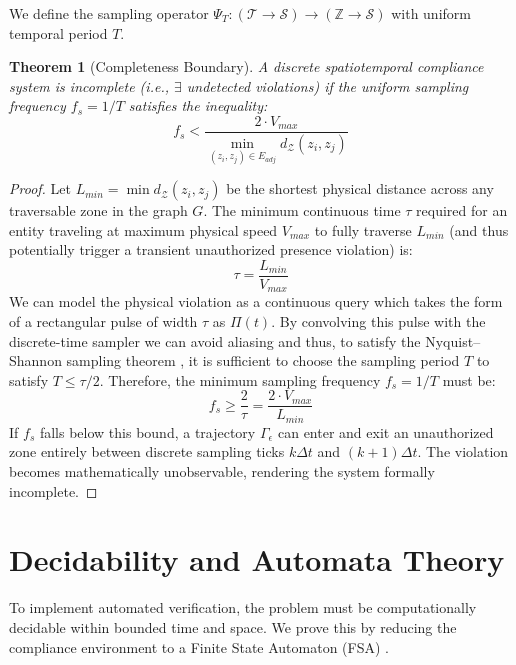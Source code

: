 \documentclass[conference]{IEEEtran}
\newtheorem{theorem}{Theorem}
\newcommand{\Z}{\mathcal{Z}} %
\newcommand{\T}{\mathcal{T}} %
\newcommand{\Sstate}{\mathcal{S}} %
\newcommand{\Tr}{\Gamma} %
\begin{document}
We define the sampling operator $\Psi_T: (\T \to \Sstate) \to (\mathbb{Z} \to \Sstate)$ with uniform temporal period $T$.



\begin{theorem}[Completeness Boundary]
A discrete spatiotemporal compliance system is incomplete (i.e., $\exists$ undetected violations) if the uniform sampling frequency $f_s = 1/T$ satisfies the inequality:
\begin{equation}
f_s < \frac{2 \cdot V_{max}}{\min_{(z_i, z_j) \in E_{adj}} d_\Z(z_i, z_j)}
\end{equation}
\end{theorem}

\begin{proof}
Let $L_{min} = \min d_\Z(z_i, z_j)$ be the shortest physical distance across any traversable zone in the graph $G$. 
The minimum continuous time $\tau$ required for an entity traveling at maximum physical speed $V_{max}$ to fully traverse $L_{min}$ (and thus potentially trigger a transient unauthorized presence violation) is:
\begin{equation}
\tau = \frac{L_{min}}{V_{max}}
\end{equation}
We can model the physical violation as a continuous query which takes the form of a rectangular pulse of width $\tau$ as $\Pi(t)$. By convolving this pulse with the discrete-time sampler we can avoid aliasing and thus, to satisfy the Nyquist–Shannon sampling theorem \cite{b4}, it is sufficient to choose the sampling period $T$ to satisfy $T \le \tau / 2$.
Therefore, the minimum sampling frequency $f_s = 1/T$ must be:
\begin{equation}
f_s \ge \frac{2}{\tau} = \frac{2 \cdot V_{max}}{L_{min}}
\end{equation}
If $f_s$ falls below this bound, a trajectory $\Tr_\epsilon$ can enter and exit an unauthorized zone entirely between discrete sampling ticks $k\Delta t$ and $(k+1)\Delta t$. The violation becomes mathematically unobservable, rendering the system formally incomplete.
\end{proof}

\section{Decidability and Automata Theory}

To implement automated verification, the problem must be computationally decidable within bounded time and space. We prove this by reducing the compliance environment to a Finite State Automaton (FSA) \cite{b5}.
\end{document}
